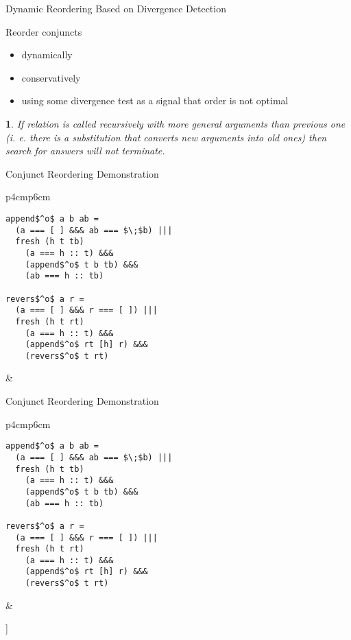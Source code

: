 \documentclass{beamer}
\theoremstyle{definition}
\theoremstyle{plain} %
\newcommand{\thistheoremname}{}
\newtheorem{genericthm}[thm]{\thistheoremname}
\newenvironment{namedthm}[1]
  {\renewcommand{\thistheoremname}{#1}%
   \begin{genericthm}}
  {\end{genericthm}}
\begin{document}
\begin{frame}{Dynamic Reordering Based on Divergence Detection}

Reorder conjuncts
 \begin{itemize}
 \item dynamically
  
 \item conservatively
 
 \item using some divergence test as a signal that order is not optimal
 \end{itemize}
 
 \vskip1cm
 
 \begin{namedthm}{Divergence test}
If relation is called recursively with more general arguments than previous one (i. e. there is a substitution that converts new arguments into old ones) then search for answers will not terminate.
\end{namedthm}

\end{frame}

\begin{frame}[fragile]{Conjunct Reordering Demonstration}
  \begin{tabular}{p{4cm}p{6cm}}
    \begin{lstlisting}
append$^o$ a b ab =		
  (a === [ ] &&& ab === $\;$b) |||
  fresh (h t tb) 
    (a === h :: t) &&&
    (append$^o$ t b tb) &&&
    (ab === h :: tb)  
  
revers$^o$ a r =	
  (a === [ ] &&& r === [ ]) |||
  fresh (h t rt) 
    (a === h :: t) &&&
    (append$^o$ rt [h] r) &&&
    (revers$^o$ t rt)
\end{lstlisting}
&
\begin{center}
\end{center}
\end{tabular}
\end{frame}

\begin{frame}[fragile]{Conjunct Reordering Demonstration}
  \begin{tabular}{p{4cm}p{6cm}}
    \begin{lstlisting}
append$^o$ a b ab =		
  (a === [ ] &&& ab === $\;$b) |||
  fresh (h t tb) 
    (a === h :: t) &&&
    (append$^o$ t b tb) &&&
    (ab === h :: tb)  
  
revers$^o$ a r =	
  (a === [ ] &&& r === [ ]) |||
  fresh (h t rt) 
    (a === h :: t) &&&
    (append$^o$ rt [h] r) &&&
    (revers$^o$ t rt)
\end{lstlisting}
&
\begin{center}
   \Tree [.{\lstinline|revers$^o\; [1,\,2,\,3]\; r$|}  [.{$[1,\,2,\,3]\not\equiv [\;]$} ] [.{$\ldots$} ] ]
\end{center}
\end{tabular}
\end{frame}
\end{document}
